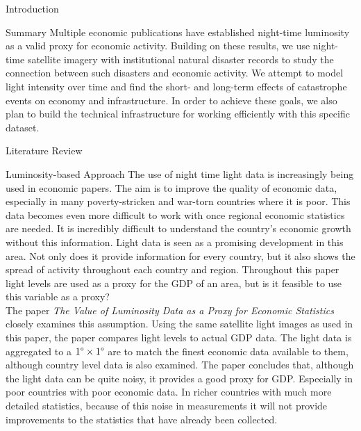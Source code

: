 \documentclass[12.5pt,fleqn,leqno,letterpaper]{article}
\begin{document}
\begin{section}{Introduction}
  \begin{subsection}{Summary}
    Multiple economic publications have established night-time luminosity as a valid proxy for economic activity. Building on these results, we use night-time satellite imagery with institutional natural disaster records to study the connection between such disasters and economic activity. We attempt to model light intensity over time and find the short- and long-term effects of catastrophe events on economy and infrastructure. In order to achieve these goals, we also plan to build the technical infrastructure for working efficiently with this specific dataset.
  \end{subsection}

  \begin{subsection}{Literature Review}
    \begin{subsubsection}{Luminosity-based Approach}
      The use of night time light data is increasingly being used in economic papers. The aim is to improve the quality of economic data, especially in many poverty-stricken and war-torn countries where it is poor. This data becomes even more difficult to work with once regional economic statistics are needed. It is incredibly difficult to understand the country's economic growth without this information. Light data is seen as a promising development in this area. Not only does it provide information for every country, but it also shows the spread of activity throughout each country and region. Throughout this paper light levels are used as a proxy for the GDP of an area, but is it feasible to use this variable as a proxy? \\
      The paper \textit{The Value of Luminosity Data as a Proxy for Economic Statistics} \cite{lightasproxy} closely examines this assumption. Using the same satellite light images as used in this paper, the paper compares light levels to actual GDP data. The light data is aggregated to a $1\degree\times 1\degree$ are to match the finest economic data available to them, although country level data is also examined. The paper concludes that, although the light data can be quite noisy, it provides a good proxy for GDP. Especially in poor countries with poor economic data. In richer countries with much more detailed statistics, because of this noise in measurements it will not provide improvements to the statistics that have already been collected.\\ 

\end{subsubsection}
\end{subsection}
\end{section}
\end{document}
